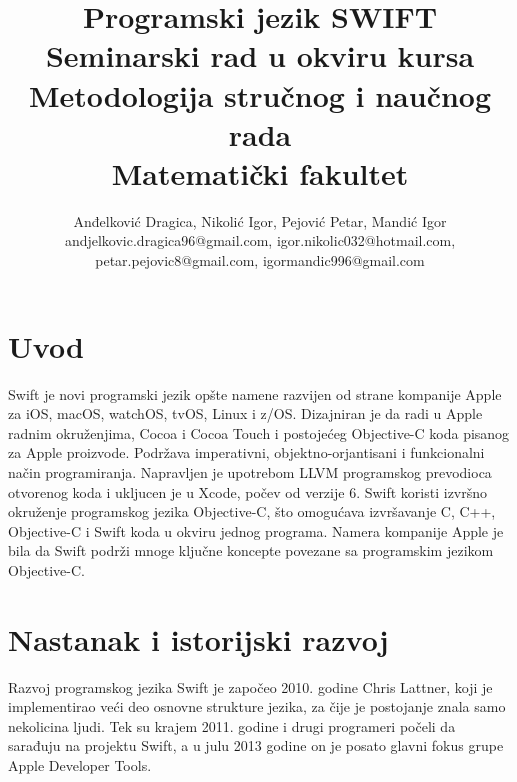 \documentclass[a4paper]{article}
\begin{document}
\title{Programski jezik SWIFT\\ \small{Seminarski rad u okviru kursa\\Metodologija stručnog i naučnog rada\\ Matematički fakultet}}

\author{Anđelković Dragica, Nikolić Igor, Pejović Petar, Mandić Igor\\ andjelkovic.dragica96@gmail.com, igor.nikolic032@hotmail.com,\\ petar.pejovic8@gmail.com, igormandic996@gmail.com}


\maketitle



\tableofcontents

\newpage

\section{Uvod}
\label{sec:uvod}
Swift je novi programski jezik  opšte namene razvijen od strane kompanije Apple za iOS, macOS, watchOS, tvOS, Linux i z/OS. Dizajniran je da radi u Apple radnim okruženjima, Cocoa i Cocoa Touch i  postojećeg Objective-C koda pisanog za Apple proizvode. Podržava imperativni, objektno-orjantisani i funkcionalni način programiranja. Napravljen je upotrebom LLVM programskog prevodioca otvorenog koda i ukljucen je u Xcode, počev od verzije 6. Swift koristi izvršno okruženje programskog jezika Objective-C, što omogućava izvršavanje C, C++, Objective-C i Swift koda u okviru jednog programa.
Namera kompanije Apple je bila  da Swift podrži mnoge ključne koncepte povezane sa programskim jezikom Objective-C.




\section{Nastanak i istorijski razvoj}
\label{sec:prviDeo}

Razvoj programskog jezika Swift je započeo 2010. godine Chris Lattner, koji je implementirao veći deo osnovne strukture jezika, za čije je postojanje znala samo nekolicina ljudi. Tek su krajem 2011. godine i drugi programeri počeli da sarađuju na projektu Swift, a u julu 2013 godine on je posato glavni fokus grupe Apple Developer Tools.
\end{document}
